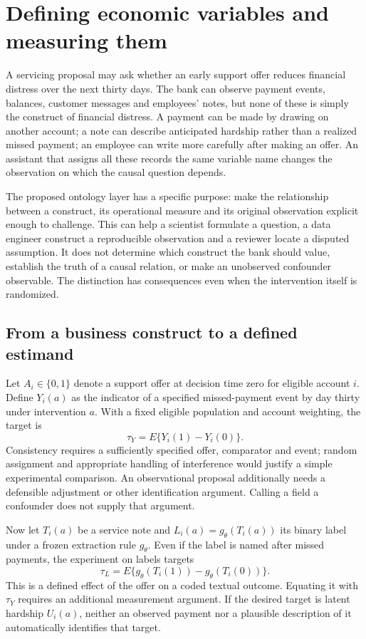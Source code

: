 \chapter{Defining economic variables and measuring them}
\label{exec17:ontology}

A servicing proposal may ask whether an early support offer reduces financial
distress over the next thirty days. The bank can observe payment events,
balances, customer messages and employees' notes, but none of these is simply
the construct of financial distress. A payment can be made by drawing on
another account; a note can describe anticipated hardship rather than a
realized missed payment; an employee can write more carefully after making an
offer. An assistant that assigns all these records the same variable name
changes the observation on which the causal question depends.

The proposed ontology layer has a specific purpose: make the relationship
between a construct, its operational measure and its original observation
explicit enough to challenge. This can help a scientist formulate a question,
a data engineer construct a reproducible observation and a reviewer locate a
disputed assumption. It does not determine which construct the bank should
value, establish the truth of a causal relation, or make an unobserved
confounder observable. The distinction has consequences even when the
intervention itself is randomized.

\section{From a business construct to a defined estimand}

Let \(A_i\in\{0,1\}\) denote a support offer at decision time zero for eligible
account \(i\). Define \(Y_i(a)\) as the indicator of a specified missed-payment
event by day thirty under intervention \(a\). With a fixed eligible population
and account weighting, the target is
\[
 \tau_Y=E\{Y_i(1)-Y_i(0)\}.
\]
Consistency requires a sufficiently specified offer, comparator and event;
random assignment and appropriate handling of interference would justify a
simple experimental comparison. An observational proposal additionally needs
a defensible adjustment or other identification argument. Calling a field a
confounder does not supply that argument.

Now let \(T_i(a)\) be a service note and \(L_i(a)=g_\theta(T_i(a))\) its binary
label under a frozen extraction rule \(g_\theta\). Even if the label is named
after missed payments, the experiment on labels targets
\[
 \tau_L=E\{g_\theta(T_i(1))-g_\theta(T_i(0))\}.
\]
This is a defined effect of the offer on a coded textual outcome. Equating it
with \(\tau_Y\) requires an additional measurement argument. If the desired
target is latent hardship \(U_i(a)\), neither an observed payment nor a
plausible description of it automatically identifies that target.

